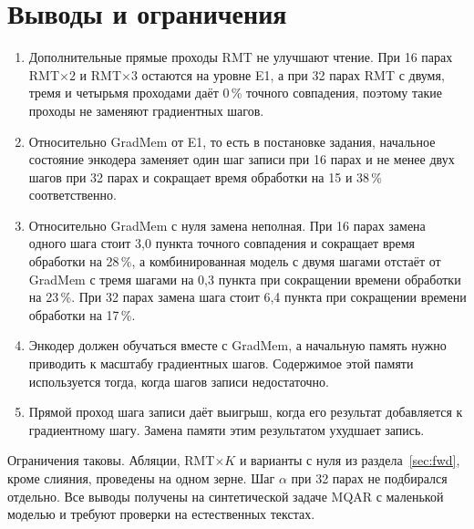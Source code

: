 \documentclass[a4paper,11pt]{article}
\begin{document}
\section{Выводы и ограничения}
\begin{enumerate}\setlength{\itemsep}{0pt}
\item Дополнительные прямые проходы RMT не улучшают чтение. При 16 парах RMT$\times2$ и RMT$\times3$ остаются на уровне E1, а при 32 парах RMT с двумя, тремя и четырьмя проходами даёт 0\,\% точного совпадения, поэтому такие проходы не заменяют градиентных шагов.
\item Относительно GradMem от E1, то есть в постановке задания, начальное состояние энкодера заменяет один шаг записи при 16 парах и не менее двух шагов при 32 парах и сокращает время обработки на 15 и 38\,\% соответственно.
\item Относительно GradMem с нуля замена неполная. При 16 парах замена одного шага стоит 3,0 пункта точного совпадения и сокращает время обработки на 28\,\%, а комбинированная модель с двумя шагами отстаёт от GradMem с тремя шагами на 0,3 пункта при сокращении времени обработки на 23\,\%. При 32 парах замена шага стоит 6,4 пункта при сокращении времени обработки на 17\,\%.
\item Энкодер должен обучаться вместе с GradMem, а начальную память нужно приводить к масштабу градиентных шагов. Содержимое этой памяти используется тогда, когда шагов записи недостаточно.
\item Прямой проход шага записи даёт выигрыш, когда его результат добавляется к градиентному шагу. Замена памяти этим результатом ухудшает запись.
\end{enumerate}

Ограничения таковы. Абляции, RMT$\times K$ и варианты с нуля из раздела~\ref{sec:fwd}, кроме слияния, проведены на одном зерне. Шаг $\alpha$ при 32 парах не подбирался отдельно. Все выводы получены на синтетической задаче MQAR с маленькой моделью и требуют проверки на естественных текстах.
\end{document}

